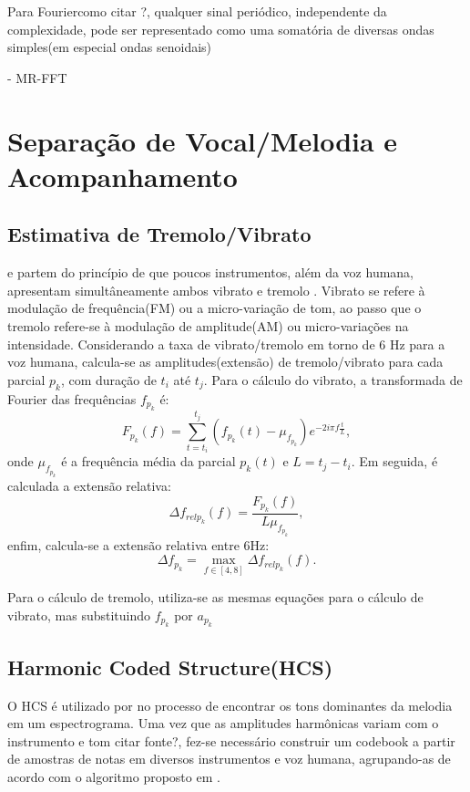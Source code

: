\documentclass[
	12pt,				%
	openright,			%
	oneside,			%
	a4paper,			%
	english,			%
	brazil,				%
	]{abntex2}
\begin{document}
Para Fourier\textsf{como citar ?}, qualquer sinal periódico, independente da complexidade, pode ser representado como uma somatória de diversas ondas simples(em especial ondas senoidais)

- MR-FFT 

\section{Separação de Vocal/Melodia e Acompanhamento}

\subsection{Estimativa de Tremolo/Vibrato}
 e  partem do princípio de que poucos instrumentos, além da voz humana, apresentam simultâneamente ambos vibrato e tremolo \cite{VerfailleGD2005}. Vibrato se refere à modulação de frequência(FM) ou a micro-variação de tom, ao passo que o tremolo refere-se à modulação de amplitude(AM) ou micro-variações na intensidade. Considerando a taxa de vibrato/tremolo em torno de 6 Hz para a voz humana, calcula-se as amplitudes(extensão) de tremolo/vibrato para cada parcial $p_k$, com duração de $t_i$ até $t_j$. Para o cálculo do vibrato, a transformada de Fourier das frequências $f_{p_k}$ é:
\begin{equation}
    F_{p_k}(f) = \displaystyle\sum_{t = t_i}^{t_j}(f_{p_k}(t) - \mu_{f_{p_k}}) e^{-2i\pi f\frac{t}{L}}, 
\end{equation}
onde $\mu_{f_{p_k}}$ é a frequência média da parcial $p_k(t)$ e $L = t_j - t_i$. Em seguida, é calculada a extensão relativa:
\begin{equation}
    \Delta f_{relp_k}(f) = \frac{F_{p_k}(f)}{L\mu_{f_{p_k}}}, 
\end{equation}
enfim, calcula-se a extensão relativa entre 6Hz:
\begin{equation}
    \Delta f_{p_k} = \max_{f\in [4, 8]}\Delta f_{relp_k}(f).
\end{equation}

Para o cálculo de tremolo, utiliza-se as mesmas equações para o cálculo de vibrato, mas substituindo $f_{p_k}$ por $a_{p_k}$

\subsection{Harmonic Coded Structure(HCS)}
O HCS é utilizado por  no processo de encontrar os tons dominantes da melodia em um espectrograma. Uma vez que as amplitudes harmônicas variam com o instrumento e tom \textsf{citar fonte?}, fez-se necessário construir um codebook a partir de amostras de notas em diversos instrumentos e voz humana, agrupando-as de acordo com o algoritmo proposto em \cite{PellegM2000}.
\end{document}
